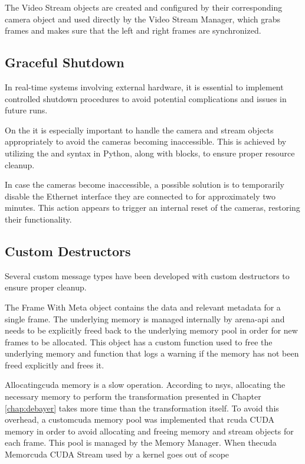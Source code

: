 The Video Stream objects are created and configured by their corresponding camera object and used directly by the Video Stream Manager, which grabs frames and makes sure that the left and right frames are synchronized.

\subsection{Graceful Shutdown}
In real-time systems involving external hardware, it is essential to implement controlled shutdown procedures to avoid potential complications and issues in future runs.

On the \sr it is especially important to handle the camera and stream objects appropriately to avoid the cameras becoming inaccessible.
This is achieved by utilizing the  and  syntax in Python, along with  blocks, to ensure proper resource cleanup.

In case the cameras become inaccessible, a possible solution is to temporarily disable the Ethernet interface they are connected to for approximately two minutes.
This action appears to trigger an internal reset of the cameras, restoring their functionality.

\subsection{Custom Destructors}
Several custom message types have been developed with custom destructors to ensure proper cleanup.

The Frame With Meta object contains the data and relevant metadata for a single frame.
The underlying memory is managed internally by \gls{arena-api} and needs to be explicitly freed back to the underlying memory pool in order for new frames to be allocated.
This object has a custom  function used to free the underlying memory and  function that logs a warning if the memory has not been freed explicitly and frees it.

Allocating\gls{cuda} memory is a slow operation.
According to \gls{nsys}, allocating the necessary memory to perform the transformation presented in Chapter \ref{chap:debayer} takes more time than the transformation itself.
To avoid this overhead, a custom\gls{cuda} memory pool was implemented that r\gls{cuda} CUDA memory in order to avoid allocating and freeing memory and stream objects for each frame.
This pool is managed by the Memory Manager.
When the\gls{cuda} Memor\gls{cuda} CUDA Stream used by a kernel goes out of scope

